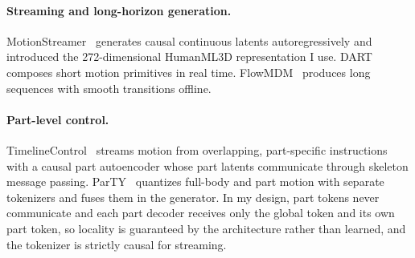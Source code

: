 \documentclass[11pt]{article}
\begin{document}
\paragraph{Streaming and long-horizon generation.}
MotionStreamer~\cite{motionstreamer} generates causal continuous latents autoregressively and introduced
the 272-dimensional HumanML3D representation I use.
DART~\cite{dart} composes short motion primitives in real time.
FlowMDM~\cite{flowmdm} produces long sequences with smooth transitions offline.

\paragraph{Part-level control.}
TimelineControl~\cite{timelinecontrol} streams motion from overlapping, part-specific instructions with a
causal part autoencoder whose part latents communicate through skeleton message passing.
ParTY~\cite{party} quantizes full-body and part motion with separate tokenizers and fuses them in the
generator.
In my design, part tokens never communicate and each part decoder receives only the global token and
its own part token, so locality is guaranteed by the architecture rather than learned, and the tokenizer
is strictly causal for streaming.
\end{document}
